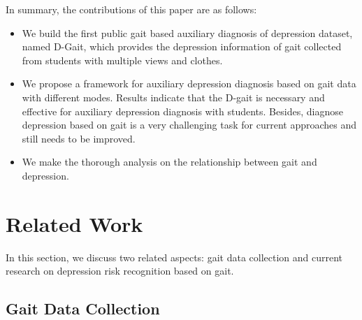 \documentclass[10pt,twocolumn,letterpaper]{article}
\begin{document}

In summary, the contributions of this paper are as follows:
\begin{itemize}
\item We build the first public gait based auxiliary diagnosis of depression dataset, named D-Gait, which provides the depression information of gait collected from students with multiple views and clothes.

\item We propose a framework for auxiliary depression diagnosis based on gait data with different modes. Results indicate that the D-gait is necessary and effective for auxiliary depression diagnosis with students. Besides, diagnose depression based on gait is a very challenging task for current approaches and still needs to be improved.

\item We make the thorough analysis on the relationship between gait and depression.
\end{itemize}

\section{Related Work}
\label{sec:intro}

In this section, we discuss two related aspects: gait data collection and current research on depression risk recognition based on gait.

\subsection{Gait Data Collection }
\end{document}
